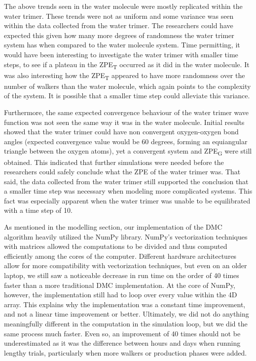 \documentclass[journal=jacsat,manuscript=article]{achemso}
\begin{document}
The above trends seen in the water molecule were mostly replicated within the water trimer. These trends were not as uniform and some variance was seen within the data collected from the water trimer. The researchers could have expected this given how many more degrees of randomness the water trimer system has when compared to the water molecule system. Time permitting, it would have been interesting to investigate the water trimer with smaller time steps, to see if a plateau in the ZPE\textsubscript{T} occurred as it did in the water molecule. It was also interesting how the ZPE\textsubscript{T} appeared to have more randomness over the number of walkers than the water molecule, which again points to the complexity of the system. It is possible that a smaller time step could alleviate this variance. 

Furthermore, the same expected convergence behaviour of the water trimer wave function was not seen the same way it was in the water molecule. Initial results showed that the water trimer could have non convergent oxygen-oxygen bond angles (expected convergence value would be 60 degrees, forming an equiangular triangle between the oxygen atoms), yet a convergent system and ZPE\textsubscript{G} were still obtained. This indicated that further simulations were needed before the researchers could safely conclude what the ZPE of the water trimer was. That said, the data collected from the water trimer still supported the conclusion that a smaller time step was necessary when modeling more complicated systems. This fact was especially apparent when the water trimer was unable to be equilibrated with a time step of 10.

As mentioned in the modelling section, our implementation of the DMC algorithm heavily utilized the NumPy library. NumPy’s vectorization techniques with matrices allowed the computations to be divided and thus computed efficiently among the cores of the computer. Different hardware architectures allow for more compatibility with vectorization techniques, but even on an older laptop, we still saw a noticeable decrease in run time on the order of 40 times faster than a more traditional DMC implementation. At the core of NumPy, however, the implementation still had to loop over every value within the 4D array. This explains why the implementation was a constant time improvement, and not a linear time improvement or better. Ultimately, we did not do anything meaningfully different in the computation in the simulation loop, but we did the same process much faster. Even so, an improvement of 40 times should not be underestimated as it was the difference between hours and days when running lengthy trials, particularly when more walkers or production phases were added.
\end{document}
